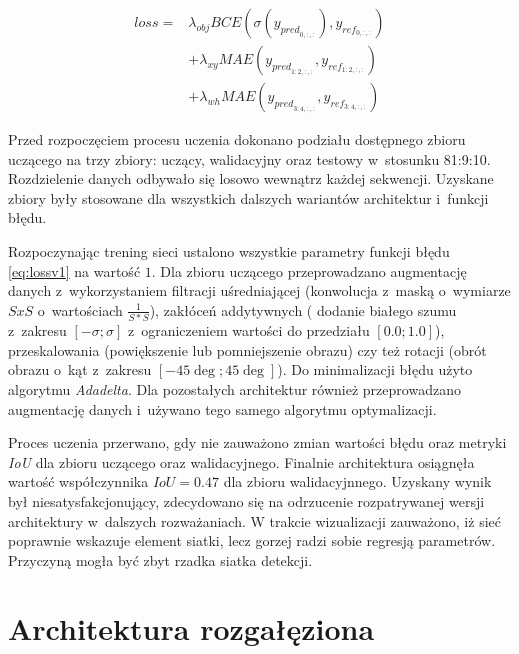 \begin{equation}
\begin{aligned}
loss =& \lambda_{obj} BCE(\sigma(y_{pred}_{0,:,:}), y_{ref}_{0,:,:}) \\
&+ \lambda_{xy}MAE(y_{pred}_{1:2,:,:}, y_{ref}_{1:2,:,:})\\
&+ \lambda_{wh}MAE(y_{pred}_{3:4,:,:},y_{ref}_{3:4,:,:}) 
\end{aligned}
\label{eq:lossv1}
\end{equation}


Przed rozpoczęciem procesu uczenia dokonano podziału dostępnego zbioru uczącego na trzy zbiory: uczący, walidacyjny oraz testowy w~stosunku 81:9:10. 
Rozdzielenie danych odbywało się losowo wewnątrz każdej sekwencji.
Uzyskane zbiory były stosowane dla wszystkich dalszych wariantów architektur i~funkcji błędu.

Rozpoczynając trening sieci ustalono wszystkie parametry funkcji błędu \eqref{eq:lossv1} na wartość $1$.
Dla zbioru uczącego przeprowadzano augmentację danych z~wykorzystaniem filtracji uśredniającej (konwolucja z~maską o~wymiarze $SxS$ o~wartościach $\frac{1}{S*S}$), zakłóceń addytywnych ( dodanie białego szumu z~zakresu $[-\sigma;\sigma]$ z~ograniczeniem wartości do przedziału $[0.0;1.0]$), przeskalowania (powiększenie lub pomniejszenie obrazu) czy też rotacji (obrót obrazu o~kąt z~zakresu $[-45\deg;45\deg]$).
Do minimalizacji błędu użyto algorytmu \emph{Adadelta}.
Dla pozostałych architektur również przeprowadzano augmentację danych i~używano tego samego algorytmu optymalizacji.

Proces uczenia przerwano, gdy nie zauważono zmian wartości błędu oraz metryki \emph{IoU} dla zbioru uczącego oraz walidacyjnego.
Finalnie architektura osiągnęła wartość współczynnika $IoU = 0.47$ dla zbioru walidacyjnnego.
Uzyskany wynik był niesatysfakcjonujący, zdecydowano się na odrzucenie rozpatrywanej wersji architektury w~dalszych rozważaniach.
W trakcie wizualizacji zauważono, iż sieć poprawnie wskazuje element siatki, lecz gorzej radzi sobie regresją parametrów.
Przyczyną mogła być zbyt rzadka siatka detekcji.

\section{Architektura rozgałęziona}


